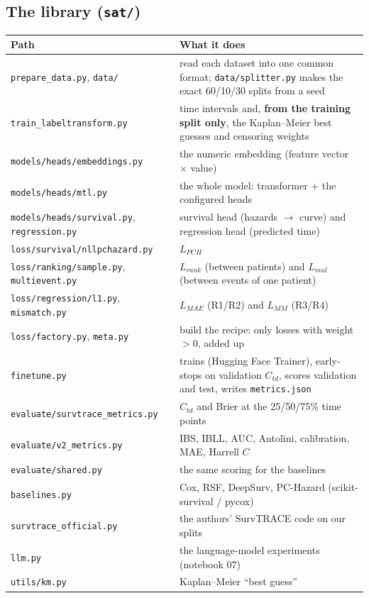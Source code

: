 \documentclass[11pt]{article}
\begin{document}
\subsection{The library (\texttt{sat/})}
\begin{table}[H]
\centering
\small
\begin{tabularx}{\textwidth}{lY}
\toprule
Path & What it does \\
\midrule
\texttt{prepare\_data.py}, \texttt{data/} & read each dataset into one common format;
  \texttt{data/splitter.py} makes the exact 60/10/30 splits from a seed \\
\texttt{train\_labeltransform.py} & time intervals and, \textbf{from the training split only}, the
  Kaplan--Meier best guesses and censoring weights \\
\texttt{models/heads/embeddings.py} & the numeric embedding (feature vector $\times$ value) \\
\texttt{models/heads/mtl.py} & the whole model: transformer + the configured heads \\
\texttt{models/heads/survival.py}, \texttt{regression.py} & survival head (hazards $\rightarrow$
  curve) and regression head (predicted time) \\
\texttt{loss/survival/nllpchazard.py} & $L_{PCH}$ \\
\texttt{loss/ranking/sample.py}, \texttt{multievent.py} & $L_{rank}$ (between patients) and $L_{mul}$
  (between events of one patient) \\
\texttt{loss/regression/l1.py}, \texttt{mismatch.py} & $L_{MAE}$ (R1/R2) and $L_{MM}$ (R3/R4) \\
\texttt{loss/factory.py}, \texttt{meta.py} & build the recipe: only losses with weight $>0$, added up \\
\texttt{finetune.py} & trains (Hugging Face Trainer), early-stops on validation $C_{td}$, scores
  validation and test, writes \texttt{metrics.json} \\
\texttt{evaluate/survtrace\_metrics.py} & $C_{td}$ and Brier at the 25/50/75\% time points \\
\texttt{evaluate/v2\_metrics.py} & IBS, IBLL, AUC, Antolini, calibration, MAE, Harrell $C$ \\
\texttt{evaluate/shared.py} & the same scoring for the baselines \\
\texttt{baselines.py} & Cox, RSF, DeepSurv, PC-Hazard (scikit-survival / pycox) \\
\texttt{survtrace\_official.py} & the authors' SurvTRACE code on our splits \\
\texttt{llm.py} & the language-model experiments (notebook 07) \\
\texttt{utils/km.py} & Kaplan--Meier ``best guess'' \\
\bottomrule
\end{tabularx}
\end{table}
\end{document}

